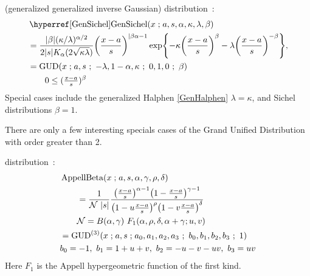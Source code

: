  (generalized generalized inverse Gaussian) distribution~\cite{Shakil2011}:
\begin{align}
\label{GenSichel}
&\opr{GenSichel}(x\given a,s, \alpha, \kappa, \lambda, \beta)
\\
&= \frac{|\beta| (\kappa/\lambda)^{\alpha/2} }{2 |s| K_{\alpha} (2\sqrt{\kappa\lambda})} \Left(\frac{x-a}{s}\Right)^{|\beta\alpha-1}
\exp\Left\{-\kappa \Left(\frac{x-a}{s}\Right)^\beta -\lambda \Left(\frac{x-a}{s}\Right)^{-\beta}\Right\},
\notag
\\
& = \op{GUD}(x \given a,s \sep -\lambda, 1-\alpha , \kappa \sep 0,1,0 \sep \beta)
\notag
\\& \qquad  0 \leq  (\tfrac{x-a}{s})^\beta \notag
\end{align}
Special cases include the generalized Halphen \eqref{GenHalphen} $\lambda= \kappa$, and Sichel distributions $\beta = 1$.






There are only a few interesting specials cases of the Grand Unified Distribution with order greater than 2.


 distribution~\cite{Nadarajah2006a}:
\begin{align}
\label{AppellBeta}
&\op{AppellBeta}(x \given a,s, \alpha, \gamma, \rho, \delta) \notag
\\& \qquad= \frac{1}{\mathcal{N}\ |s|} 
\frac{ \bigl(\frac{x-a}{s}\bigr)^{\alpha-1} \bigl(1-\frac{x-a}{s}\bigr)^{\gamma-1} }
	{ \bigl(1 - u \frac{x-a}{s} \bigr)^{\rho} \bigl(1-v \frac{x-a}{s} \bigr)^{\delta} }
	\checked
\\
&\qquad \mathcal{N}  = B(\alpha, \gamma)\ F_1(\alpha,\rho,\delta,\alpha+\gamma;  u, v)\checked
\notag
\\ \notag
&= \op{GUD}^{(3)}(x\given a,s \given a_0,a_1,a_2,a_3\ ;\  b_0,b_1,b_2,b_3 \ ;\ 1) 
\\ \notag &
b_0= -1,\ b_1 =1+u+v,\ b_2= -u-v-uv,\ b_3= uv \checked
\notag
\end{align}
Here $F_1$ is the Appell hypergeometric function of the first kind.



